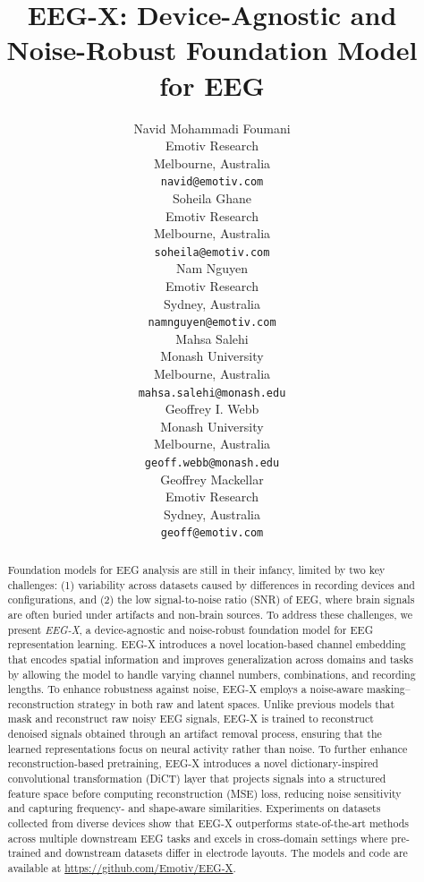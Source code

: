 \documentclass{article} %
\title{EEG-X: Device-Agnostic and Noise-Robust Foundation Model for EEG}
\author{Navid Mohammadi Foumani \\
Emotiv Research \\
Melbourne, Australia \\
\texttt{navid@emotiv.com} \\
\And
Soheila Ghane \\
Emotiv Research \\
Melbourne, Australia \\
\texttt{soheila@emotiv.com} \\
\And
Nam Nguyen \\
Emotiv Research \\
Sydney, Australia \\
\texttt{namnguyen@emotiv.com} \\
\And
Mahsa Salehi \\
Monash University \\
Melbourne, Australia \\
\texttt{mahsa.salehi@monash.edu} \\
\And
Geoffrey I. Webb \\
Monash University \\
Melbourne, Australia \\
\texttt{geoff.webb@monash.edu} \\
\And
Geoffrey Mackellar \\
Emotiv Research \\
Sydney, Australia \\
\texttt{geoff@emotiv.com} \\
}
\begin{document}
\maketitle

\begin{abstract}

Foundation models for EEG analysis are still in their infancy, limited by two key challenges: (1) variability across datasets caused by differences in recording devices and configurations, and (2) the low signal-to-noise ratio (SNR) of EEG, where brain signals are often buried under artifacts and non-brain sources. To address these challenges, we present \textit{EEG-X}, a device-agnostic and noise-robust foundation model for EEG representation learning. EEG-X introduces a novel location-based channel embedding that encodes spatial information and improves generalization across domains and tasks by allowing the model to handle varying channel numbers, combinations, and recording lengths. To enhance robustness against noise, EEG-X employs a noise-aware masking–reconstruction strategy in both raw and latent spaces. Unlike previous models that mask and reconstruct raw noisy EEG signals, EEG-X is trained to reconstruct denoised signals obtained through an artifact removal process, ensuring that the learned representations focus on neural activity rather than noise. To further enhance reconstruction-based pretraining, EEG-X introduces a novel dictionary-inspired convolutional transformation (DiCT) layer that projects signals into a structured feature space before computing reconstruction (MSE) loss, reducing noise sensitivity and capturing frequency- and shape-aware similarities. Experiments on datasets collected from diverse devices show that EEG-X outperforms state-of-the-art methods across multiple downstream EEG tasks and excels in cross-domain settings where pre-trained and downstream datasets differ in electrode layouts. The models and code are available at \url{https://github.com/Emotiv/EEG-X}.






\end{abstract}
\end{document}
